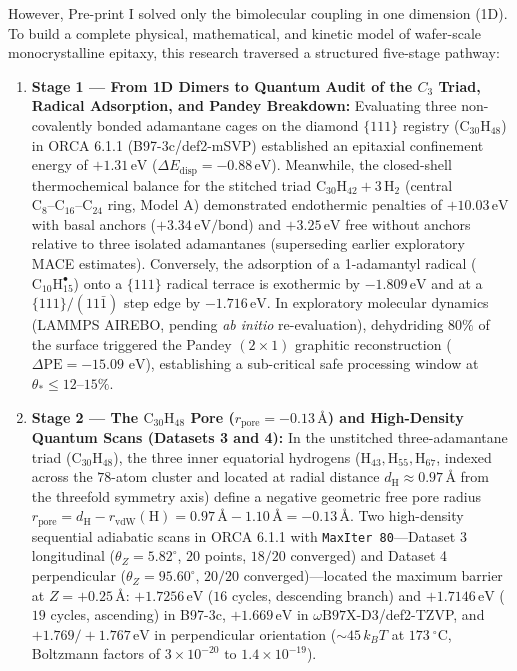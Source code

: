 \documentclass[10pt,twocolumn,a4paper]{article}
\begin{document}
However, Pre-print I solved only the bimolecular coupling in one dimension (1D). To build a complete physical, mathematical, and kinetic model of wafer-scale monocrystalline epitaxy, this research traversed a structured five-stage pathway:

\begin{enumerate}
    \item \textbf{Stage 1 --- From 1D Dimers to Quantum Audit of the $C_3$ Triad, Radical Adsorption, and Pandey Breakdown:} Evaluating three non-covalently bonded adamantane cages on the diamond $\{111\}$ registry ($\text{C}_{30}\text{H}_{48}$) in ORCA 6.1.1 (B97-3c/def2-mSVP) established an epitaxial confinement energy of $+1.31\,\text{eV}$ ($\Delta E_{\text{disp}} = -0.88\,\text{eV}$). Meanwhile, the closed-shell thermochemical balance for the stitched triad $\text{C}_{30}\text{H}_{42} + 3\,\text{H}_2$ (central $\text{C}_8\text{--C}_{16}\text{--C}_{24}$ ring, Model A) demonstrated endothermic penalties of $\mathbf{+10.03}\,\text{eV}$ with basal anchors ($+3.34\,\text{eV/bond}$) and $\mathbf{+3.25}\,\text{eV}$ free without anchors relative to three isolated adamantanes (superseding earlier exploratory MACE estimates). Conversely, the adsorption of a 1-adamantyl radical ($\text{C}_{10}\text{H}_{15}^\bullet$) onto a $\{111\}$ radical terrace is exothermic by $\mathbf{-1.809}\,\text{eV}$ and at a $\{111\}/(11\bar{1})$ step edge by $\mathbf{-1.716}\,\text{eV}$. In exploratory molecular dynamics (LAMMPS AIREBO, pending \textit{ab initio} re-evaluation), dehydriding $80\%$ of the surface triggered the Pandey $(2\times 1)$ graphitic reconstruction ($\Delta\text{PE} = -15.09\text{ eV}$), establishing a sub-critical safe processing window at $\theta_* \le 12\text{--}15\%$.
    \item \textbf{Stage 2 --- The $\text{C}_{30}\text{H}_{48}$ Pore ($r_{\text{pore}} = -0.13\,\text{\AA}$) and High-Density Quantum Scans (Datasets 3 and 4):} In the unstitched three-adamantane triad ($\text{C}_{30}\text{H}_{48}$), the three inner equatorial hydrogens ($\text{H}_{43}, \text{H}_{55}, \text{H}_{67}$, indexed across the $78$-atom cluster and located at radial distance $d_{\text{H}} \approx 0.97\,\text{\AA}$ from the threefold symmetry axis) define a negative geometric free pore radius $r_{\text{pore}} = d_{\text{H}} - r_{\text{vdW}}(\text{H}) = 0.97\,\text{\AA} - 1.10\,\text{\AA} = \mathbf{-0.13}\,\text{\AA}$. Two high-density sequential adiabatic scans in ORCA 6.1.1 with \texttt{MaxIter 80}---Dataset 3 longitudinal ($\theta_Z = 5.82^\circ$, $20$ points, $18/20$ converged) and Dataset 4 perpendicular ($\theta_Z = 95.60^\circ$, $20/20$ converged)---located the maximum barrier at $Z = +0.25\,\text{\AA}$: $\mathbf{+1.7256}\,\text{eV}$ ($16$ cycles, descending branch) and $\mathbf{+1.7146}\,\text{eV}$ ($19$ cycles, ascending) in B97-3c, $\mathbf{+1.669}\,\text{eV}$ in $\omega\text{B97X-D3}$/def2-TZVP, and $\mathbf{+1.769 / +1.767}\,\text{eV}$ in perpendicular orientation (${\sim}45\,k_B T$ at $173\ ^\circ\text{C}$, Boltzmann factors of $3 \times 10^{-20}\text{ to }1.4 \times 10^{-19}$).

\end{enumerate}
\end{document}
